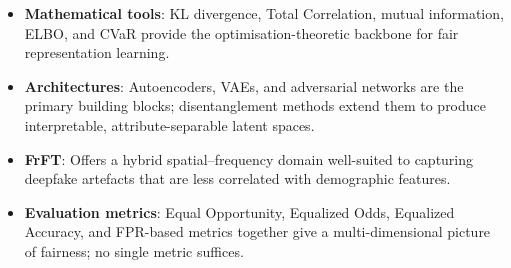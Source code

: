 \begin{itemize}
  \item \textbf{Mathematical tools}: KL divergence, Total
        Correlation, mutual information, ELBO, and CVaR provide
        the optimisation-theoretic backbone for fair
        representation learning.
  \item \textbf{Architectures}: Autoencoders, VAEs, and adversarial
        networks are the primary building blocks; disentanglement
        methods extend them to produce interpretable, attribute-separable
        latent spaces.
  \item \textbf{FrFT}: Offers a hybrid spatial–frequency domain
        well-suited to capturing deepfake artefacts that are less
        correlated with demographic features.
  \item \textbf{Evaluation metrics}: Equal Opportunity,
        Equalized Odds, Equalized Accuracy, and FPR-based metrics
        together give a multi-dimensional picture of fairness;
        no single metric suffices.
\end{itemize}